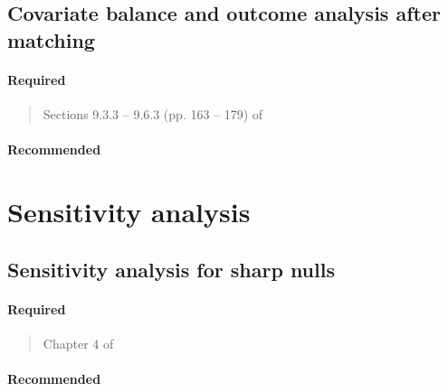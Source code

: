 \documentclass[12pt]{article}
\begin{document}
\subsection{Covariate balance and outcome analysis after matching}

\paragraph*{Required}

\begin{verse}
\end{verse}

\begin{verse}
  Sections 9.3.3 -- 9.6.3 (pp. 163 -- 179) of 
\end{verse}
\newpage
\paragraph*{Recommended}

\begin{verse}
\end{verse}

\begin{verse}
\end{verse}

\section{Sensitivity analysis}

\subsection{Sensitivity analysis for sharp nulls}

\paragraph*{Required}

\begin{verse} Chapter 4 of  \end{verse}

\begin{verse}  \end{verse}

\paragraph*{Recommended}
\end{document}
